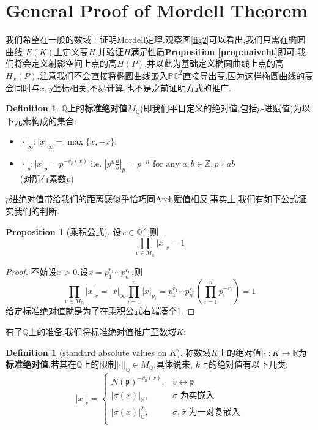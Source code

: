 \documentclass[12pt,A4paper,oneside,reqno]{amsart}
\numberwithin{equation}{section}
\theoremstyle{definition}
\newtheorem{proposition}[theorem]{Proposition}
\newtheorem{defn}[theorem]{Definition}
\theoremstyle{plain}
\theoremstyle{plain}
\numberwithin{equation}{section}
\theoremstyle{remark}
\begin{document}
\section{General Proof of Mordell Theorem}
我们希望在一般的数域上证明Mordell定理.观察图\ref{fig2}可以看出,我们只需在椭圆曲线 $E(K)$上定义高$H$,并验证$H$满足性质\textbf{Proposition \ref{prop:naiveht}}即可.我们将会定义射影空间上点的高$H(P)$,并以此为基础定义椭圆曲线上点的高$H_x(P)$.注意我们不会直接将椭圆曲线嵌入$\mathbb{PC}^2$直接导出高,因为这样椭圆曲线的高会同时与$x,y$坐标相关,不易计算,也不是之前证明方式的推广.
\begin{defn}
	$\mathbb{Q}$上的\textbf{标准绝对值}$M_{\mathbb{Q}}$(即我们平日定义的绝对值,包括$p$-进赋值)为以下元素构成的集合:
	\begin{itemize}
		\item $\displaystyle|\cdot|_{\infty}:|x|_{\infty}=\max\{x,-x\}$;
		\item $\displaystyle|\cdot|_{p}:|x|_{p}=p^{-v_p(x)}\text{ i.e. } \left|p^n\frac{a}{b}\right|_p=p^{-n} \text{ for any }a,b \in \mathbb{Z}, p \nmid ab$\\
		(对所有素数$p$)
	\end{itemize}
\end{defn}
$p$进绝对值带给我们的距离感似乎恰巧同Arch赋值相反.事实上,我们有如下公式证实我们的判断.
\begin{proposition}[乘积公式]
	设$x \in \mathbb{Q}^{\times}$,则
	$$\prod_{v \in M_\mathbb{Q}}|x|_v=1$$
\end{proposition}
\begin{proof}
	不妨设$x>0$.设$x=p_1^{r_1} \cdots p_n^{r_n}$,则
	$$\prod_{v \in M_\mathbb{Q}}|x|_v=|x|_{\infty}\prod_{i=1}^{n}|x|_{p_i}=p_1^{r_1} \cdots p_n^{r_n}(\prod_{i=1}^{n} p_i^{-r_i})=1$$
	给定标准绝对值就是为了在乘积公式右端凑个1.
\end{proof}
有了$\mathbb{Q}$上的准备,我们将标准绝对值推广至数域$K$:
\begin{defn}[standard absolute values on $K$]
	称数域$K$上的绝对值$|\cdot|:K\longrightarrow \mathbb{R}$为\textbf{标准绝对值},若其在$\mathbb{Q}$上的限制$|\cdot|\big|_{\mathbb{Q}} \in M_{\mathbb{Q}}$.具体说来, $k$上的绝对值有以下几类:
	\begin{equation*}
		|x|_v=\begin{cases}
		N(\mathfrak{p})^{-v_{\mathfrak{p}}(x)}, & v \leftrightarrow \mathfrak{p}\\
		|\sigma(x)|_{\mathbb{R}},& \sigma \text{ 为实嵌入}\\
		|\sigma(x)|_{\mathbb{C}}^2,& \sigma,\bar{\sigma} \text{ 为一对复嵌入}\\
		\end{cases}
	\end{equation*}
\end{defn}
\end{document}
